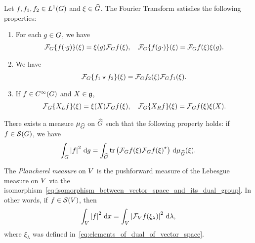 \begin{proposition}
    Let $f, f_1, f_2 \in \Lebesgue{1}{\Group}$ and $\xi \in \dualGroup\Group$.
    The Fourier Transform satisfies the following properties:
    \begin{enumerate}
        \item For each $g \in \Group$, we have
            \begin{align*}
                \Fourier \{f(\dummy g)\} (\xi)
                = \xi(g) \Fourier f(\xi), \quad
                \Fourier \{f(g \dummy)\} (\xi)
                = \Fourier f(\xi) \xi(g).
            \end{align*}
        \item We have
            \begin{align*}
                \Fourier \{\conv{f_1}{f_2}\}(\xi)
                = \Fourier f_2(\xi) \Fourier f_1(\xi).
            \end{align*}
        \item If $f \in \SmoothFunctions\Group$ and $X \in \LieAlgebra$,
            \begin{align*}
                \Fourier \{\LeftDifferentialOperatorFirstOrder{X} f\}(\xi)
                = \xi(X) \Fourier f(\xi), \quad
                \Fourier \{\RightDifferentialOperatorFirstOrder{X} f\}(\xi)
                = \Fourier f(\xi) \xi(X).
            \end{align*}
    \end{enumerate}
\end{proposition}

\begin{proposition}
    There exists a measure $\Plancherel\Group$ on $\dualGroup\Group$ such that the following property holds:
    if $f \in \Schwartz\Group$, we have
    \begin{align*}
        \int_\Group \abs{f}^2 \dd g
        = \int_{\dualGroup\Group} \tr \left( \Fourier f(\xi) \adj{\Fourier f(\xi)} \right) \dd \Plancherel\Group(\xi).
    \end{align*}
\end{proposition}

\begin{example}
    The \emph{Plancherel measure} on $\VectorSpace$ is the pushforward measure of the Lebesgue measure on $\VectorSpace$ via the isomorphism~\eqref{eq:isomorphism_between_vector_space_and_its_dual_group}.
    In other words, if $f \in \Schwartz\VectorSpace$, then
    \begin{align*}
        \int_\VectorSpace \abs{f}^2 \dd x = \int_\VectorSpace \abs{\Fourier[\VectorSpace] f(\xi_\lambda)}^2 \dd \lambda,
    \end{align*}
    where $\xi_\lambda$ was defined in~\eqref{eq:elements_of_dual_of_vector_space}.
\end{example}

